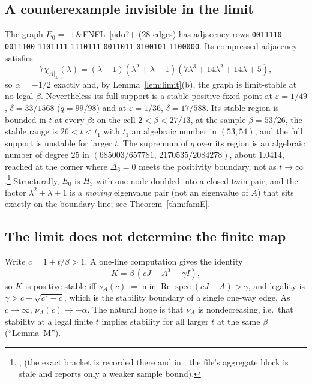 \documentclass[11pt]{article}
\theoremstyle{definition}
\newcommand{\eps}{\varepsilon}
\newcommand{\perpc}[1]{#1|_{\perp}}
\newcommand{\spec}{\operatorname{spec}}
\newcommand{\Rea}{\operatorname{Re}}
\begin{document}
\subsection{A counterexample invisible in the limit}
The graph $E_0=$ \dsix+&FNFL~[udo?+ ($28$ edges) has adjacency rows \texttt{0011110} \texttt{0011100} \texttt{1101111}
\texttt{1110111} \texttt{0011011} \texttt{0100101} \texttt{1100000}. Its compressed adjacency satisfies
\[
7\chi_{\perpc{A}}(\lambda)=(\lambda+1)(\lambda^2+\lambda+1)(7\lambda^3+14\lambda^2+14\lambda+5),
\]
so $\alpha=-1/2$ exactly and, by Lemma~\ref{lem:limit}(b), the graph is limit-stable at no legal $\beta$. Nevertheless its full
support is a stable positive fixed point at $\eps=1/49$, $\delta=33/1568$ ($q=99/98$) and at $\eps=1/36$, $\delta=17/588$. Its
stable region is bounded in $t$ at every $\beta$: on the cell $2<\beta<27/13$, at the sample $\beta=53/26$, the stable range is
$26<t<t_1$ with $t_1$ an algebraic number in $(53,54)$, and the full support is unstable for larger $t$. The supremum of $q$
over its region is an algebraic number of degree $25$ in $(685003/657781,\,2170535/2084278)$, about $1.0414$, reached at the
corner where $\Delta_6=0$ meets the positivity boundary, not as $t\to\infty$.\footnote{;  (the exact bracket is recorded there and in ; the file's aggregate block is stale and reports only a weaker sample bound).}
Structurally, $E_0$ is $H_3$ with one node doubled into a closed-twin pair, and the factor $\lambda^2+\lambda+1$ is a \emph{moving}
eigenvalue pair (not an eigenvalue of $A$) that sits exactly on the boundary line; see Theorem~\ref{thm:famE}.

\subsection{The limit does not determine the finite map}
Write $c=1+t/\beta>1$. A one-line computation gives the identity
\begin{equation}\label{eq:E}
K=\beta\,(cJ-A^T-\gamma I),
\end{equation}
so $K$ is positive stable iff $\nu_A(c):=\min\Rea\spec(cJ-A)>\gamma$, and legality is $\gamma>c-\sqrt{c^2-c}$, which is the
stability boundary of a single one-way edge. As $c\to\infty$, $\nu_A(c)\to-\alpha$. The natural hope is that
$\nu_A$ is nondecreasing, i.e.\ that stability at a legal finite $t$ implies stability for all larger $t$ at the same $\beta$
(``Lemma~M'').
\end{document}
